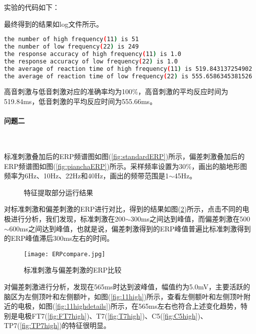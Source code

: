 \documentclass{hitreport}
\begin{document}
实验的代码如下：


最终得到的结果如log文件所示。
\begin{lstlisting}[language=bash]
the number of high frequency(11) is 51
the number of low frequency(22) is 249
the response accuracy of high frequency(11) is 1.0
the response accuracy of low frequency(22) is 1.0
the average of reaction time of high frequency(11) is 519.843137254902
the average of reaction time of low frequency(22) is 555.6586345381526
\end{lstlisting}


高音刺激与低音刺激对应的准确率均为100\%，高音刺激的平均反应时间为519.84ms，低音刺激的平均反应时间为555.66ms。

\paragraph{问题二}~{}

标准刺激叠加后的ERP频谱图如图(\ref{fig:standardERP})所示，偏差刺激叠加后的ERP频谱图如图(\ref{fig:pianchaERP})所示。采样频率设置为30\%，画出的脑地形图频率为6Hz、10Hz、22Hz和40Hz，画出的频带范围是1$\sim$45Hz。

\begin{figure}[htb]
	\centering
	\hspace{5pt}
	\caption{特征提取部分运行结果}\label{fig:feature}
\end{figure}

对标准刺激和偏差刺激的ERP进行对比，得到的结果如图(\ref{fig:ERPcompare})所示，点击不同的电极进行分析，我们发现，标准刺激在200$\sim$300ms之间达到峰值，而偏差刺激在500$\sim$600ms之间达到峰值，也就是说，偏差刺激得到的ERP峰值普遍比标准刺激得到的ERP峰值滞后300ms左右的时间。

\begin{figure}[htb]
\centering
\texttt{[image: ERPcompare.jpg]}
\caption{标准刺激与偏差刺激的ERP比较}\label{fig:ERPcompare}
\end{figure}

对偏差刺激进行分析，发现在565ms时达到波峰值，幅值约为5.0mV，主要活跃的脑区为左侧顶叶和左侧额叶，如图(\ref{fig:11high})所示，查看左侧额叶和左侧顶叶附近的电极，如图(\ref{fig:11highdetails})所示，在565ms左右也符合上述变化趋势，特别是电极FT7(\ref{fig:FT7high})、T7(\ref{fig:T7high})、C5(\ref{fig:C5high})、TP7(\ref{fig:TP7high})的特征很明显。
\end{document}
